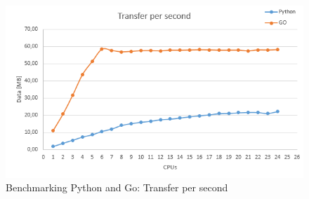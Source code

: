 \begin{figure}[htb]\centering
  \includegraphics[width=1\textwidth]{images/benchmark-transfer.png}
  \caption
    {Benchmarking Python and Go: Transfer per second}
  \label{fig:benchmark-transfer}
\end{figure}